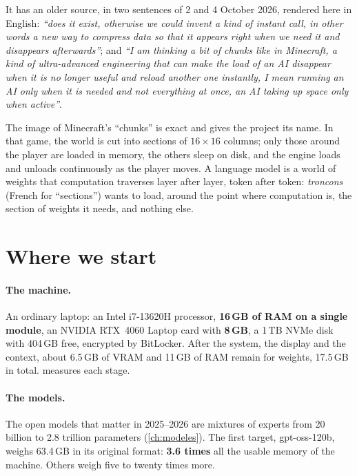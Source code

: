 It has an older source, in two sentences of 2 and 4 October 2026, rendered here in English: \emph{\enquote{does it exist, otherwise we could invent a kind of instant call, in other words a new way to compress data so that it appears right when we need it and disappears afterwards}}; and \emph{\enquote{I am thinking a bit of chunks like in Minecraft, a kind of ultra-advanced engineering that can make the load of an AI disappear when it is no longer useful and reload another one instantly, I mean running an AI only when it is needed and not everything at once, an AI taking up space only when active}}.

The image of Minecraft's \enquote{chunks} is exact and gives the project its name. In that game, the world is cut into sections of $16 \times 16$ columns; only those around the player are loaded in memory, the others sleep on disk, and the engine loads and unloads continuously as the player moves. A language model is a world of weights that computation traverses layer after layer, token after token: \emph{troncons} (French for \enquote{sections}) wants to load, around the point where computation is, the section of weights it needs, and nothing else.

\section{Where we start}\label{sec:depart}

\paragraph{The machine.} An ordinary laptop: an Intel i7-13620H processor, \textbf{16\,GB of RAM on a single module}, an NVIDIA RTX~4060 Laptop card with \textbf{8\,GB}, a 1\,TB NVMe disk with 404\,GB free, encrypted by BitLocker. After the system, the display and the context, about 6.5\,GB of VRAM and 11\,GB of RAM remain for weights, 17.5\,GB in total.  measures each stage.

\paragraph{The models.} The open models that matter in 2025--2026 are mixtures of experts from 20 billion to 2.8 trillion parameters (\cref{ch:modeles}). The first target, gpt-oss-120b, weighs 63.4\,GB in its original format: \textbf{3.6 times} all the usable memory of the machine. Others weigh five to twenty times more.

